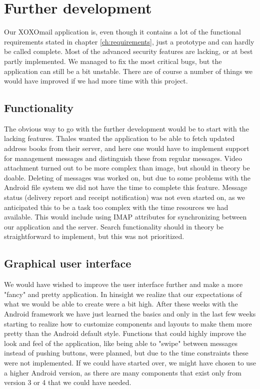 \newpage

\section{Further development}\label{con_further}

Our XOXOmail application is, even though it contains a lot of the functional requirements stated in chapter \ref{ch:requirements}, just a prototype and can hardly be called complete. Most of the advanced security features are lacking, or at best partly implemented. We managed to fix the most critical bugs, but the application can still be a bit unstable. There are of course a number of things we would have improved if we had more time with this project. 

\subsection{Functionality}
The obvious way to go with the further development would be to start with the lacking features. Thales wanted the application to be able to fetch updated address books from their server, and here one would have to implement support for management messages and distinguish these from regular messages. Video attachment turned out to be more complex than image, but should in theory be doable. Deleting of messages was worked on, but due to some problems with the Android file system we did not have the time to complete this feature. Message status (delivery report and receipt notification) was not even started on, as we anticipated this to be a task too complex with the time resources we had available. This would include using IMAP attributes for synchronizing between our application and the server. Search functionality should in theory be straightforward to implement, but this was not prioritized.

\subsection{Graphical user interface}
We would have wished to improve the user interface further and make a more "fancy" and pretty application. In hinsight we realize that our expectations of what we would be able to create were a bit high. After these weeks with the Android framework we have just learned the basics and only in the last few weeks 	starting to realize how to customize components and layouts to make them more pretty than the Android default style. Functions that could highly improve the look and feel of the application, like being able to "swipe" between messages instead of pushing buttons, were planned, but due to the time constraints these were not implemented. If we could have started over, we might have chosen to use a higher Android version, as there are many components that exist only from version 3 or 4 that we could have needed.

